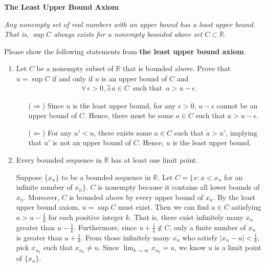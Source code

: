 \newpage
\begin{exercise}
	\textbf{The Least Upper Bound Axiom}

	\emph{Any nonempty set of real numbers with an upper bound has a least upper bound. That is, $\sup  C$ always exists for a nonempty bounded above set $C \subset \mathbb{R}$.}

	Please show the following statements from \textbf{the least upper bound axiom}.
	\begin{enumerate}

		\item Let $C$ be a nonempty subset of $\mathbb{R}$ that is bounded above. Prove that $u = \sup C$ if and only if $u$ is an upper bound of $C$ and
			\begin{align*}
				\forall\,\epsilon>0,\exists\,a \in C\,\text{ such that }\,a>u-\epsilon.
			\end{align*}

			\begin{solution}
				\begin{itemize}
					\item []
					\item [($\Rightarrow$)]
						Since $u$ is the least upper bound, for any $\epsilon>0$, $u-\epsilon$ cannot be an upper bound of $C$. Hence, there must be some $a\in C$ such that $a>u-\epsilon$.
					\item [($\Leftarrow$)]
						For any $u'<u$, there exists some $a\in C$ such that $a>u'$, implying that $u'$ is not an upper bound of $C$. Hence, $u$ is the least upper bound.
						\qedhere
				\end{itemize}
			\end{solution}

		\item Every bounded sequence in $\mathbb{R}$ has at least one limit point.

			\begin{solution}
				Suppose $\{x_n\}$ to be a bounded sequence in $\mathbb{R}$.
				Let $C = \{x : x < x_n$ for an infinite number of $ x_n\}$. $C$ is nonempty because it contains all lower bounds of ${x_n}$.
				Moreover, $C$ is bounded above by every upper bound of ${x_n}$.
				By the least upper bound axiom, $u = \sup C$ must exist.
				Then we can find $a\in C$ satisfying $a>u-\frac{1}{k}$ for each positive integer $k$.
				That is, there exist infinitely many $x_n$ greater than $u-\frac{1}{k}$.
				Furthermore, since $u+\frac{1}{k}\not\in C$, only a finite number of $x_n$ is greater than $u+\frac{1}{k}$.
				From those infinitely many $x_n$ who satisfy $|x_n-u|<\frac{1}{k}$, pick $x_{n_k}$ such that $x_{n_k} \neq u$.
				Since $\lim_{k\to\infty}x_{n_k}=u$, we know $u$ is a limit point of $\{x_n\}$.
				\qedhere
			\end{solution}


\end{enumerate}
\end{exercise}
